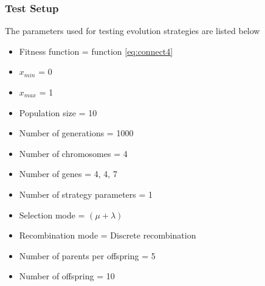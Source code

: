 \subsubsection{Test Setup}
The parameters used for testing evolution strategies are listed below
\begin{itemize}
  \item{Fitness function = function \ref{eq:connect4}}
  \item{$x_{min}$ = 0}
  \item{$x_{max}$ = 1}
  \item{Population size = 10}
  \item{Number of generations = 1000}
  \item{Number of chromosomes = 4}
  \item{Number of genes = 4, 4, 7}
  \item{Number of strategy parameters = 1}
  \item{Selection mode = $(\mu+\lambda)$}
  \item{Recombination mode = Discrete recombination}
  \item{Number of parents per offspring = 5}
  \item{Number of offspring = 10}
\end{itemize}

